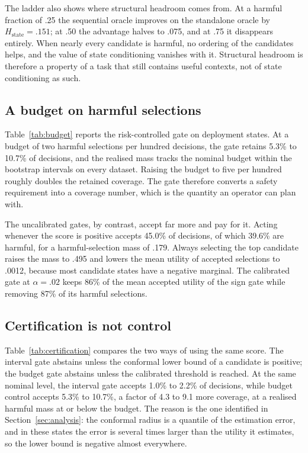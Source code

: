 The ladder also shows where structural headroom comes from. At a harmful
fraction of .25 the sequential oracle improves on the standalone oracle by
$H_{\mathrm{state}}=.151$; at .50 the advantage halves to .075, and at .75 it
disappears entirely. When nearly every candidate is harmful, no ordering of
the candidates helps, and the value of state conditioning vanishes with it.
Structural headroom is therefore a property of a task that still contains
useful contexts, not of state conditioning as such.



\subsection{A budget on harmful selections}

Table~\ref{tab:budget} reports the risk-controlled gate on deployment states.
At a budget of two harmful selections per hundred decisions, the gate retains
5.3\% to 10.7\% of decisions, and the realised mass tracks the nominal budget
within the bootstrap intervals on every dataset. Raising the budget to five
per hundred roughly doubles the retained coverage. The gate therefore converts
a safety requirement into a coverage number, which is the quantity an operator
can plan with.



The uncalibrated gates, by contrast, accept far more and pay for it. Acting
whenever the score is positive accepts 45.0\% of decisions, of which 39.6\% are
harmful, for a harmful-selection mass of .179. Always selecting the top
candidate raises the mass to .495 and lowers the mean utility of accepted
selections to .0012, because most candidate states have a negative marginal.
The calibrated gate at $\alpha=.02$ keeps 86\% of the mean accepted utility of
the sign gate while removing 87\% of its harmful selections.

\subsection{Certification is not control}

Table~\ref{tab:certification} compares the two ways of using the same score.
The interval gate abstains unless the conformal lower bound of a candidate is
positive; the budget gate abstains unless the calibrated threshold is reached.
At the same nominal level, the interval gate accepts 1.0\% to 2.2\% of
decisions, while budget control accepts 5.3\% to 10.7\%, a factor of 4.3 to
9.1 more coverage, at a realised harmful mass at or below the budget. The
reason is the one identified in Section~\ref{sec:analysis}: the conformal
radius is a quantile of the estimation error, and in these states the error is
several times larger than the utility it estimates, so the lower bound is
negative almost everywhere.

